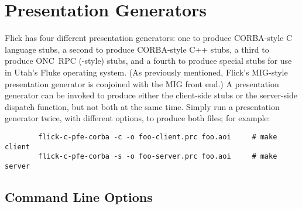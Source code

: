 

\section{Presentation Generators}
\label{sec:Presentation Generators}

Flick has four different presentation generators: one to produce CORBA-style C
language stubs, a second to produce CORBA-style C++ stubs, a third to produce
ONC~RPC (-style) stubs, and a fourth to produce special stubs
for use in Utah's Fluke operating system.  (As previously mentioned, Flick's
MIG-style presentation generator is conjoined with the MIG front end.)  A
presentation generator can be invoked to produce either the client-side stubs
or the server-side dispatch function, but not both at the same time.  Simply
run a presentation generator twice, with different options, to produce both
files; for example:

\begin{verbatim}
        flick-c-pfe-corba -c -o foo-client.prc foo.aoi     # make client
        flick-c-pfe-corba -s -o foo-server.prc foo.aoi     # make server
\end{verbatim}



\subsection{Command Line Options}
\label{subsec:PG:Command Line Options}

